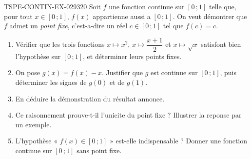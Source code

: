 \begin{exercice}{TSPE-CONTIN-EX-029}{3}{20}
Soit $f$ une fonction continue sur $[0\,;1]$ telle que, pour tout $x \in [0\,;1]$, $f(x)$ appartienne aussi a $[0\,;1]$. On veut démontrer que $f$ admet un \emph{point fixe}, c'est-a-dire un réel $c \in [0\,;1]$ tel que $f(c) = c$.

\begin{enumerate}
  \item Vérifier que les trois fonctions $x \mapsto x^2$, $x \mapsto \dfrac{x+1}{2}$ et $x \mapsto \sqrt{x}$ satisfont bien l'hypothèse sur $[0\,;1]$, et déterminer leurs points fixes.
  \item On pose $g(x) = f(x) - x$. Justifier que $g$ est continue sur $[0\,;1]$, puis déterminer les signes de $g(0)$ et de $g(1)$.
  \item En déduire la démonstration du résultat annonce.
  \item Ce raisonnement prouve-t-il l'unicite du point fixe ? Illustrer la reponse par un exemple.
  \item L'hypothèse « $f(x) \in [0\,;1]$ » est-elle indispensable ? Donner une fonction continue sur $[0\,;1]$ sans point fixe.
\end{enumerate}
\end{exercice}
